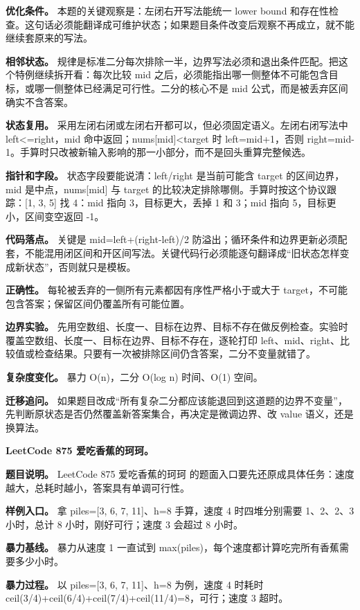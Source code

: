 \textbf{优化条件。} 本题的关键观察是：左闭右开写法能统一 lower bound 和存在性检查。这句话必须能翻译成可维护状态；如果题目条件改变后观察不再成立，就不能继续套原来的写法。

\textbf{相邻状态。} 规律是标准二分每次排除一半，边界写法必须和退出条件匹配。把这个特例继续拆开看：每次比较 mid 之后，必须能指出哪一侧整体不可能包含目标，或哪一侧整体已经满足可行性。二分的核心不是 mid 公式，而是被丢弃区间确实不含答案。

\textbf{状态复用。} 采用左闭右闭或左闭右开都可以，但必须固定语义。左闭右闭写法中 left<=right，mid 命中返回；nums[mid]<target 时 left=mid+1，否则 right=mid-1。手算时只改被新输入影响的那一小部分，而不是回头重算完整候选。

\textbf{指针和字段。} 状态字段要能说清：left/right 是当前可能含 target 的区间边界，mid 是中点，nums[mid] 与 target 的比较决定排除哪侧。手算时按这个协议跟踪：[1, 3, 5] 找 4：mid 指向 3，目标更大，丢掉 1 和 3；mid 指向 5，目标更小，区间变空返回 -1。

\textbf{代码落点。} 关键是 mid=left+(right-left)/2 防溢出；循环条件和边界更新必须配套，不能混用闭区间和开区间写法。关键代码行必须能逐句翻译成“旧状态怎样变成新状态”，否则就只是模板。

\textbf{正确性。} 每轮被丢弃的一侧所有元素都因有序性严格小于或大于 target，不可能包含答案；保留区间仍覆盖所有可能位置。

\textbf{边界实验。} 先用空数组、长度一、目标在边界、目标不存在做反例检查。实验时覆盖空数组、长度一、目标在边界、目标不存在，逐轮打印 left、mid、right、比较值或检查结果。只要有一次被排除区间仍含答案，二分不变量就错了。

\textbf{复杂度变化。} 暴力 O(n)，二分 O(log n) 时间、O(1) 空间。

\textbf{迁移追问。} 如果题目改成“所有复杂二分都应该能退回到这道题的边界不变量”，先判断原状态是否仍然覆盖新答案集合，再决定是微调边界、改 value 语义，还是换算法。

\noindent\textbf{LeetCode 875 爱吃香蕉的珂珂。}

\textbf{题目说明。} LeetCode 875 爱吃香蕉的珂珂 的题面入口要先还原成具体任务：速度越大，总耗时越小，答案具有单调可行性。

\textbf{样例入口。} 拿 piles=[3, 6, 7, 11]、h=8 手算，速度 4 时四堆分别需要 1、2、2、3 小时，总计 8 小时，刚好可行；速度 3 会超过 8 小时。

\textbf{暴力基线。} 暴力从速度 1 一直试到 max(piles)，每个速度都计算吃完所有香蕉需要多少小时。

\textbf{暴力过程。} 以 piles=[3, 6, 7, 11]、h=8 为例，速度 4 时耗时 ceil(3/4)+ceil(6/4)+ceil(7/4)+ceil(11/4)=8，可行；速度 3 超时。

